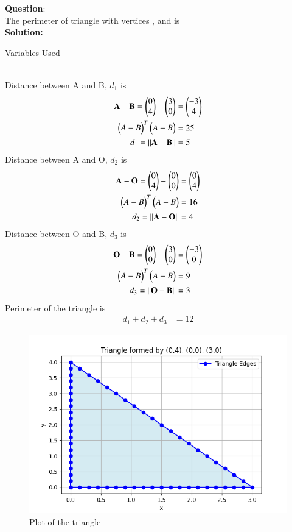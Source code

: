 \documentclass[journal]{IEEEtran}
\begin{document}
\textbf{Question}:\\
The perimeter of triangle with vertices , and  is
\\
\textbf{Solution: }
\begin{table}[h!]    
  \centering
  
  \caption{Variables Used}
  \label{tab10.5.3.9.1}
\end{table}\\
Distance between A and B, $d_1$ is
\begin{align}
    \mathbf{A} - \mathbf{B} = \begin{pmatrix}0\\4\end{pmatrix} - \begin{pmatrix}3\\0\end{pmatrix} &= \begin{pmatrix}-3\\4\end{pmatrix}\\
    \begin{pmatrix}A-B\end{pmatrix}^T\begin{pmatrix}A-B\end{pmatrix}&=25\\
    d_1=||\mathbf{A}-\mathbf{B}||&=5
\end{align}
Distance between A and O, $d_2$ is
\begin{align}
    \mathbf{A} - \mathbf{O} = \begin{pmatrix}0\\4\end{pmatrix} - \begin{pmatrix}0\\0\end{pmatrix} &= \begin{pmatrix}0\\4\end{pmatrix}\\
    \begin{pmatrix}A-B\end{pmatrix}^T\begin{pmatrix}A-B\end{pmatrix}&=16\\
    d_2=||\mathbf{A}-\mathbf{O}||&=4
\end{align}
Distance between O and B, $d_3$ is
\begin{align}
    \mathbf{O} - \mathbf{B} = \begin{pmatrix}0\\0\end{pmatrix} - \begin{pmatrix}3\\0\end{pmatrix} &= \begin{pmatrix}-3\\0\end{pmatrix}\\
    \begin{pmatrix}A-B\end{pmatrix}^T\begin{pmatrix}A-B\end{pmatrix}&=9\\
    d_3=||\mathbf{O}-\mathbf{B}||&=3
\end{align}
Perimeter of the triangle is 
\begin{align}
    d_1+d_2+d_3&=12
\end{align}
\begin{figure}[h!]
   \centering
   \includegraphics[width=0.7\linewidth]{figs/fig.png}
   \caption{Plot of the triangle}
   \label{stemplot}
\end{figure}
\end{document}

